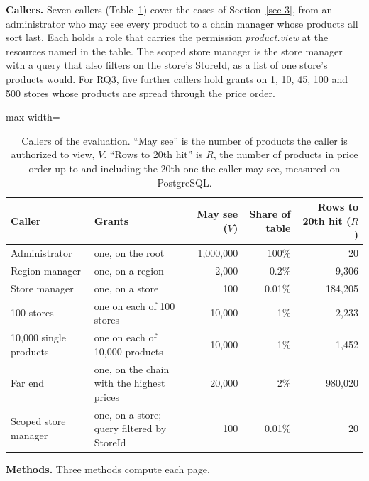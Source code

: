 \documentclass[conference]{IEEEtran}
\begin{document}
\textbf{Callers.} Seven callers (Table~\ref{tab:3}) cover the cases of Section~\ref{sec-3}, from an administrator who may see every product to a chain manager whose products all sort last. Each holds a role that carries the permission \emph{product.view} at the resources named in the table. The scoped store manager is the store manager with a query that also filters on the store's StoreId, as a list of one store's products would. For RQ3, five further callers hold grants on 1, 10, 45, 100 and 500 stores whose products are spread through the price order.

\begin{table}[!tp]
\centering
\caption{Callers of the evaluation. ``May see'' is the number of products the caller is authorized to view, \(V\). ``Rows to 20th hit'' is \(R\), the number of products in price order up to and including the 20th one the caller may see, measured on PostgreSQL.}
\label{tab:3}
\scriptsize
\begin{adjustbox}{max width=\textwidth}
\begin{tabular}{@{}llrrr@{}}
\toprule\noalign{}
Caller & Grants & May see (\(V\)) & Share of table & Rows to 20th hit (\(R\)) \\
\midrule\noalign{}
Administrator & one, on the root & 1,000,000 & 100\% & 20 \\
Region manager & one, on a region & 2,000 & 0.2\% & 9,306 \\
Store manager & one, on a store & 100 & 0.01\% & 184,205 \\
100 stores & one on each of 100 stores & 10,000 & 1\% & 2,233 \\
10,000 single products & one on each of 10,000 products & 10,000 & 1\% & 1,452 \\
Far end & one, on the chain with the highest prices & 20,000 & 2\% & 980,020 \\
Scoped store manager & one, on a store; query filtered by StoreId & 100 & 0.01\% & 20 \\
\bottomrule
\end{tabular}
\end{adjustbox}
\end{table}

\textbf{Methods.} Three methods compute each page.
\end{document}
